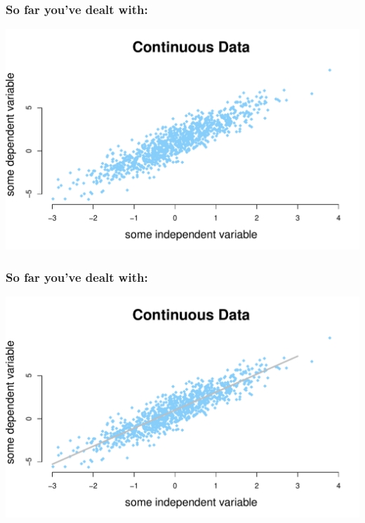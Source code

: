\documentclass[aspectratio=169]{beamer}
\begin{document}
\begin{frame}
\frametitle{So far you've dealt with:}
\begin{center}
\includegraphics[scale=0.55]{continuous_data.pdf}
\end{center}
\end{frame}

\begin{frame}
\frametitle{So far you've dealt with:}
\begin{center}
\includegraphics[scale=0.55]{continuous_data_w_line.pdf}
\end{center}
\end{frame}
\end{document}
